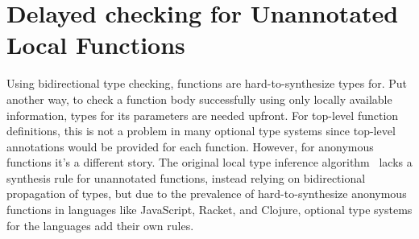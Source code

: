 %



\chapter{Delayed checking for Unannotated Local Functions}
\label{chapter:symbolic:symbolic-closures}

Using bidirectional type checking, functions are hard-to-synthesize types for.
Put another way, to check a function body successfully using only locally available information,
types for its parameters are needed upfront.
For top-level function definitions, this is not a problem in many
optional type systems since top-level annotations would be provided
for each function.
However, for anonymous functions it's a different story.
The original local type inference algorithm~\cite{PierceLTI}
lacks a synthesis rule for unannotated functions, instead relying on bidirectional
propagation of types,
but due to the prevalence
of hard-to-synthesize anonymous functions in languages like JavaScript, Racket, and Clojure,
optional type systems for the languages add their own rules.

